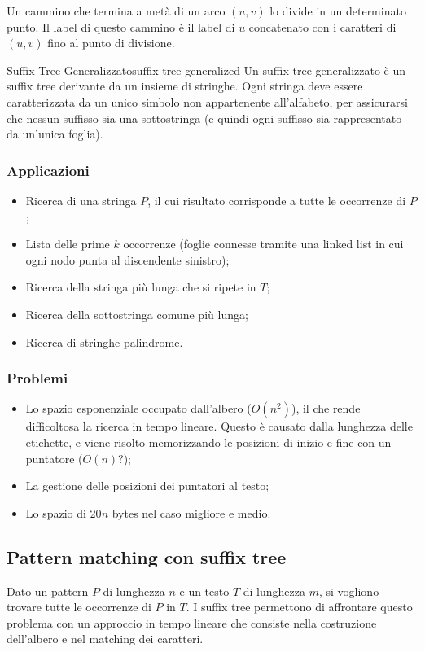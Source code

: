 Un cammino che termina a metà di un arco $(u, v)$ lo divide in un determinato punto. Il label di questo cammino è il label di $u$ concatenato con i caratteri di $(u, v)$ fino al punto di divisione.


\begin{definition}{Suffix Tree Generalizzato}{suffix-tree-generalized}
	Un suffix tree generalizzato è un suffix tree derivante da un insieme di stringhe. Ogni stringa deve essere caratterizzata da un unico simbolo non appartenente all'alfabeto, per assicurarsi che nessun suffisso sia una sottostringa (e quindi ogni suffisso sia rappresentato da un'unica foglia).	
\end{definition}

\subsubsection{Applicazioni}
\begin{itemize}
	\item Ricerca di una stringa $P$, il cui risultato corrisponde a tutte le occorrenze di $P$;
	\item Lista delle prime $k$ occorrenze (foglie connesse tramite una linked list in cui ogni nodo punta al discendente sinistro);
	\item Ricerca della stringa più lunga che si ripete in $T$;
	\item Ricerca della sottostringa comune più lunga;
	\item Ricerca di stringhe palindrome.
\end{itemize}

\subsubsection{Problemi}
\begin{itemize}
	\item Lo spazio esponenziale occupato dall'albero ($O(n^2)$), il che rende difficoltosa la ricerca in tempo lineare. Questo è causato dalla lunghezza delle etichette, e viene risolto memorizzando le posizioni di inizio e fine con un puntatore ($O(n)$?);
	\item La gestione delle posizioni dei puntatori al testo;
	\item Lo spazio di 20$n$ bytes nel caso migliore e medio.
\end{itemize}

\subsection{Pattern matching con suffix tree}
Dato un pattern $P$ di lunghezza $n$ e un testo $T$ di lunghezza $m$, si vogliono trovare tutte le occorrenze di $P$ in $T$. I suffix tree permettono di affrontare questo problema con un approccio in tempo lineare che consiste nella costruzione dell'albero e nel matching dei caratteri. 

